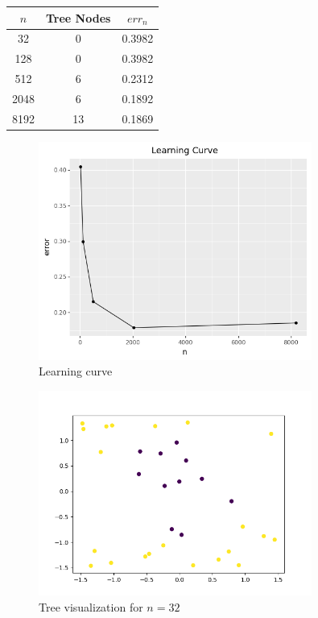 \documentclass[a4paper]{article}
\theoremstyle{definition}
\newenvironment{soln}{
    \leavevmode\color{blue}\ignorespaces
}{}
\begin{document}
\begin{soln}
  \begin{center}
    \begin{tabular}{|c|c|c|}
      \hline
      $n$ & Tree Nodes & $err_n$ \\
      \hline
      32  &  0  &  0.3982  \\
      128  &  0  &  0.3982  \\
      512  &  6  &  0.2312  \\
      2048  &  6  &  0.1892  \\
      8192  &  13  &  0.1869  \\
      \hline
    \end{tabular}
    \end{center}

    \begin{figure}[H]
      \centering
      \includegraphics[width=0.8\textwidth]{../plots/error_curve.png}
      \caption{Learning curve}
      \label{fig:error_curve} 
    \end{figure}

    \begin{figure}[H]
      \centering
      \includegraphics[width=0.8\textwidth]{../plots/dbig_32.png}
      \caption{Tree visualization for $n = 32$}
      \label{fig:dbig_32}
    \end{figure}
    

\end{soln}
\end{document}

